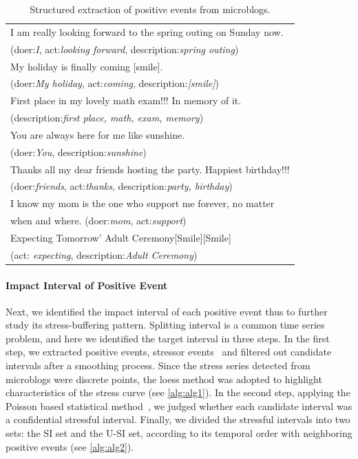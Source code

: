 \begin{table}
\begin{center}
\caption{\small{Structured extraction of positive events from microblogs.}}
\small{
\begin{tabular}{l} \hline \rowcolor{gray!40}
I am really looking forward to the spring outing on Sunday now. \\ \rowcolor{gray!40}
(doer:\emph{I}, act:\emph{looking forward}, description:\emph{spring outing})\\
My holiday is finally coming [smile]. \\
(doer:\emph{My holiday}, act:\emph{coming}, description:\emph{[smile]})\\ \rowcolor{gray!40}%
First place in my lovely math exam!!! In memory of it.\\ \rowcolor{gray!40}
(description:\emph{first place, math, exam, memory})\\ %
You are always here for me like sunshine. \\
(doer:\emph{You}, description:\emph{sunshine})\\ \rowcolor{gray!40} %
Thanks all my dear friends hosting the party.
Happiest birthday!!!\\ \rowcolor{gray!40}
(doer:\emph{friends}, act:\emph{thanks}, description:\emph{party, birthday})\\
I know my mom is the one who support me forever, no matter \\
when and where. (doer:\emph{mom}, act:\emph{support})\\ \rowcolor{gray!40}
Expecting Tomorrow' Adult Ceremony[Smile][Smile]~~\\ \rowcolor{gray!40}
(act: \emph{expecting}, description:\emph{Adult Ceremony})\\ \hline
\end{tabular}}
\label{tab:uplifts}
\end{center}
\end{table}

\paragraph{Impact Interval of Positive Event}
Next, we identified the impact interval of each positive event thus to further study its stress-buffering pattern.
Splitting interval is a common time series problem, and here we identified the target interval in three steps.
In the first step, we extracted positive events, stressor events~\citep{Li2017Analyzing} and filtered out candidate intervals after a smoothing process.
Since the stress series detected from microblogs were discrete points,
the loess method was adopted to highlight characteristics of the stress curve (see \ref{alg:alg1}).
In the second step, applying the Poisson based statistical method~\citep{Li2017Analyzing},
we judged whether each candidate interval was a confidential stressful interval.
Finally, we divided the stressful intervals into two sets: the SI set and the U-SI set,
according to its temporal order with neighboring positive events (see \ref{alg:alg2}).


